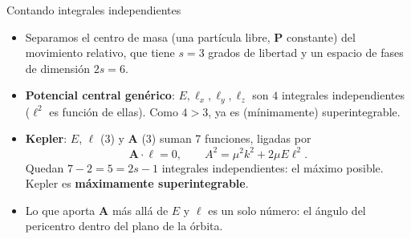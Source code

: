 \documentclass[aspectratio=169]{beamer}
\newcommand{\vA}{\mathbf A}
\newcommand{\vl}{\boldsymbol\ell}
\begin{document}
\begin{frame}{Contando integrales independientes}
\small
\begin{itemize}
  \item<1-> Separamos el centro de masa (una partícula libre, $\mathbf P$ constante) del
        movimiento relativo, que tiene $s=3$ grados de libertad y un espacio de fases de
        dimensión $2s=6$.
  \item<2-> \textbf{Potencial central genérico}: $E,\ell_x,\ell_y,\ell_z$ son $4$ integrales
        independientes ($\ell^{2}$ es función de ellas). Como $4>3$, ya es (mínimamente)
        superintegrable.
  \item<3-> \textbf{Kepler}: $E$, $\vl$ (3) y $\vA$ (3) suman 7 funciones, ligadas por
  \[
    \vA\cdot\vl=0,\qquad A^{2}=\mu^{2}k^{2}+2\mu E\ell^{2}.
  \]
        Quedan $7-2=5=2s-1$ integrales independientes: el máximo posible.
        Kepler es \textbf{máximamente superintegrable}.
  \item<4-> Lo que aporta $\vA$ más allá de $E$ y $\vl$ es un solo número: el ángulo del
        pericentro dentro del plano de la órbita.
\end{itemize}
\end{frame}
\end{document}

